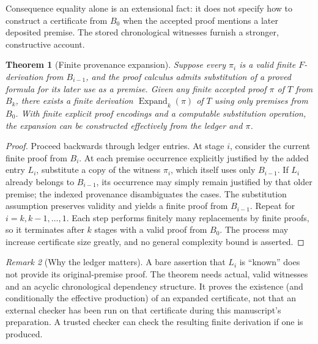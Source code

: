 \documentclass[11pt,letterpaper]{article}
\newtheorem{theorem}{Theorem}[section]
\theoremstyle{definition}
\theoremstyle{remark}
\newtheorem{remark}[theorem]{Remark}
\begin{document}
Consequence equality alone is an extensional fact: it does not specify how to construct a certificate from $B_0$ when the accepted proof mentions a later deposited premise. The stored chronological witnesses furnish a stronger, constructive account.

\begin{theorem}[Finite provenance expansion]\label{thm:B_expand}
Suppose every $\pi_i$ is a valid finite $F$-derivation from $B_{i-1}$, and the proof calculus admits substitution of a proved formula for its later use as a premise. Given any finite accepted proof $\pi$ of $T$ from $B_k$, there exists a finite derivation $\operatorname{Expand}_k(\pi)$ of $T$ using only premises from $B_0$. With finite explicit proof encodings and a computable substitution operation, the expansion can be constructed effectively from the ledger and $\pi$.
\end{theorem}
\begin{proof}
Proceed backwards through ledger entries. At stage $i$, consider the current finite proof from $B_i$. At each premise occurrence explicitly justified by the added entry $L_i$, substitute a copy of the witness $\pi_i$, which itself uses only $B_{i-1}$. If $L_i$ already belongs to $B_{i-1}$, its occurrence may simply remain justified by that older premise; the indexed provenance disambiguates the cases. The substitution assumption preserves validity and yields a finite proof from $B_{i-1}$. Repeat for $i=k,k-1,\ldots,1$. Each step performs finitely many replacements by finite proofs, so it terminates after $k$ stages with a valid proof from $B_0$. The process may increase certificate size greatly, and no general complexity bound is asserted.
\end{proof}

\begin{remark}[Why the ledger matters]
A bare assertion that $L_i$ is ``known'' does not provide its original-premise proof. The theorem needs actual, valid witnesses and an acyclic chronological dependency structure. It proves the existence (and conditionally the effective production) of an expanded certificate, not that an external checker has been run on that certificate during this manuscript's preparation. A trusted checker can check the resulting finite derivation if one is produced.
\end{remark}
\end{document}
